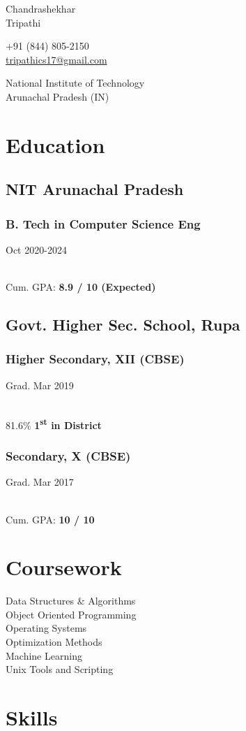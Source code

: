 \documentclass[]{article}
\newcommand{\namesection}[3]{
  \begin{multicols}{2}
    \begin{flushleft}
      \fontsize{30pt}{25pt}
      \fontspec[Path = fonts/ZillaSlab/]{ZillaSlab-Light}
      {{ #1 }\\ { #2 }}
      \columnbreak\\
    \end{flushleft}
    \begin{flushright}
      { #3 }
    \end{flushright}
  \end{multicols}
  \vspace{-10pt}
}
\newcommand{\subheading}[2]{
  {\subsubsection*{#1}
  \hfill #2} \\
}
\begin{document}
\namesection{Chandrashekhar}{Tripathi}{
  +91 (844) 805-2150\\
  \href{mailto:tripathics17@gmail.com}{tripathics17@gmail.com}\par
  National Institute of Technology\\
  Arunachal Pradesh (IN)
}


\begin{multicols}{2}
  \begin{flushleft}
    \section*{Education}
    \subsection*{NIT Arunachal Pradesh}
    \subheading{B. Tech in Computer Science Eng}{Oct 2020-2024}
    Cum. GPA: \textbf{8.9 / 10 (Expected)} \\

    \subsection*{Govt. Higher Sec. School, Rupa}
    \subheading{Higher Secondary, XII (CBSE)}{Grad. Mar 2019}
    81.6\% \textbf{1\textsuperscript{st} in District}

    \subheading{Secondary, X (CBSE)}{Grad. Mar 2017}
    Cum. GPA: \textbf{10 / 10} \\
    
    \section*{Coursework}
    Data Structures \& Algorithms \\
    Object Oriented Programming \\
    Operating Systems \\
    Optimization Methods \\
    Machine Learning \\
    Unix Tools and Scripting \\

    \section*{Skills}

\end{flushleft}
\end{multicols}
\end{document}
